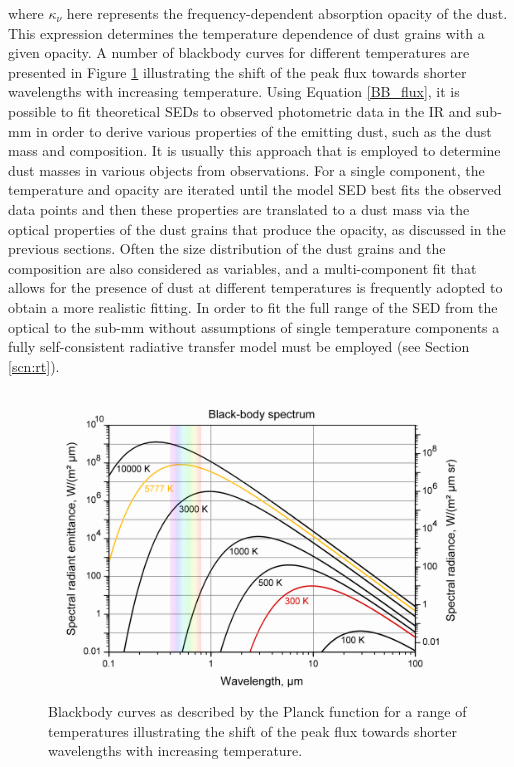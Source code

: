 \noindent where $\kappa_{\nu}$ here represents the frequency-dependent absorption opacity of the dust.  This expression determines the temperature dependence of dust grains with a given opacity.  A number of blackbody curves for different temperatures are presented in Figure \ref{BB} illustrating the shift of the peak flux towards shorter wavelengths with increasing temperature.  Using Equation \ref{BB_flux}, it is possible to fit theoretical SEDs to  observed photometric data in the IR and sub-mm in order to derive various properties of the emitting dust, such as the dust mass and composition.  It is usually this approach that is employed to determine dust masses in various objects from observations.  For a single component, the temperature and opacity are iterated until the model SED best fits the observed data points and then these properties are translated to a dust mass via the optical properties of the dust grains that produce the opacity, as discussed in the previous sections.  Often the size distribution of the dust grains and the composition are also considered as variables, and a multi-component fit that allows for the presence of dust at different temperatures is frequently adopted to obtain a  more realistic fitting.  In order to fit  the full range of the SED from the optical to the sub-mm without assumptions of single temperature components  a fully self-consistent radiative transfer model must be employed (see Section \ref{scn:rt}).

\begin{figure}
\centering
\includegraphics[clip=true,scale=0.5,trim= 30 20 20 20]{chapters/chapter1/figs/BB_curves4.png}
\caption{Blackbody curves as described by the Planck function for a range of temperatures illustrating the shift of the peak flux towards shorter wavelengths with increasing temperature.}
\label{BB}
\end{figure}

